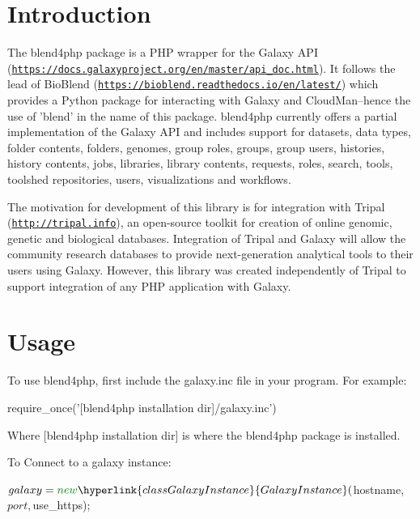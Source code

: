 \hypertarget{index_intro_sec}{}\section{Introduction}\label{index_intro_sec}
The blend4php package is a P\-H\-P wrapper for the Galaxy A\-P\-I (\href{https://docs.galaxyproject.org/en/master/api_doc.html}{\tt https\-://docs.\-galaxyproject.\-org/en/master/api\-\_\-doc.\-html}). It follows the lead of Bio\-Blend (\href{https://bioblend.readthedocs.io/en/latest/}{\tt https\-://bioblend.\-readthedocs.\-io/en/latest/}) which provides a Python package for interacting with Galaxy and Cloud\-Man--hence the use of 'blend' in the name of this package. blend4php currently offers a partial implementation of the Galaxy A\-P\-I and includes support for datasets, data types, folder contents, folders, genomes, group roles, groups, group users, histories, history contents, jobs, libraries, library contents, requests, roles, search, tools, toolshed repositories, users, visualizations and workflows.

The motivation for development of this library is for integration with Tripal (\href{http://tripal.info}{\tt http\-://tripal.\-info}), an open-\/source toolkit for creation of online genomic, genetic and biological databases. Integration of Tripal and Galaxy will allow the community research databases to provide next-\/generation analytical tools to their users using Galaxy. However, this library was created independently of Tripal to support integration of any P\-H\-P application with Galaxy.\hypertarget{index_usage_sec}{}\section{Usage}\label{index_usage_sec}
To use blend4php, first include the galaxy.\-inc file in your program. For example\-:


\begin{DoxyCode}
require\_once(\textcolor{stringliteral}{'[blend4php installation dir]/galaxy.inc'})
\end{DoxyCode}


Where \mbox{[}blend4php installation dir\mbox{]} is where the blend4php package is installed.

To Connect to a galaxy instance\-:


\begin{DoxyCode}
$galaxy = \textcolor{keyword}{new} \hyperlink{classGalaxyInstance}{GalaxyInstance}($hostname, $port, $use\_https);
\end{DoxyCode}



